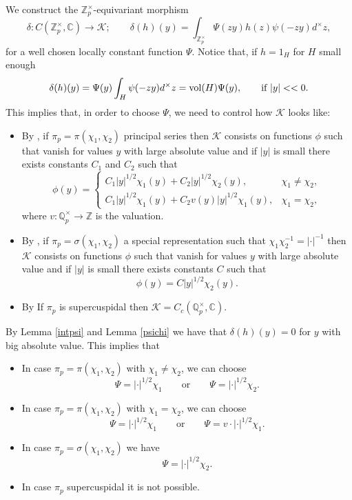 \documentclass{amsart}
\newcommand{\Z}{{\mathbb Z}}
\newcommand{\Q}{{\mathbb Q}}
\newcommand{\C}{{\mathbb C}}
\begin{document}
We construct the $\Z_p^\times$-equivariant morphism
\[
\delta:C(\Z_p^\times,\C)\longrightarrow \mathcal{K};\qquad \delta(h)(y)=\int_{\Z_p^\times}\Psi(zy)h(z)\psi(-zy)d^\times z,
\]
for a well chosen locally constant function $\Psi$. Notice that, if $h=1_{H}$ for $H$ small enough 
\[
\delta(h)(y)=\Psi(y)\int_{H}\psi(-zy)d^\times z={\rm vol}(H)\Psi(y),\qquad \mbox{if $|y|<<0$.}
\]
This implies that, in order to choose $\Psi$, we need to control how $\mathcal{K}$ looks like:
\begin{itemize}
\item By \cite[Theorem 4.7.2]{Bump}, if $\pi_p=\pi(\chi_1,\chi_2)$ principal series then $\mathcal{K}$ consists on functions $\phi$ such that vanish for values $y$ with large absolute value and if $|y|$ is small there exists constants $C_1$ and $C_2$ such that
\[
\phi(y)=\left\{\begin{array}{ll}C_1|y|^{1/2}\chi_1(y)+C_2|y|^{1/2}\chi_2(y),&\chi_1\neq\chi_2,\\C_1|y|^{1/2}\chi_1(y)+C_2v(y)|y|^{1/2}\chi_1(y),&\chi_1=\chi_2,\end{array}\right.
\]  
where $v:\Q_p^\times\rightarrow\Z$ is the valuation.

\item By \cite[Theorem 4.7.3]{Bump}, if $\pi_p=\sigma(\chi_1,\chi_2)$ a special representation such that $\chi_1\chi_2^{-1}=|\cdot|^{-1}$ then $\mathcal{K}$ consists on functions $\phi$ such that vanish for values $y$ with large absolute value and if $|y|$ is small there exists constants $C$ such that
\[
\phi(y)=C|y|^{1/2}\chi_2(y).
\]  

\item By \cite[Theorem 4.7.1]{Bump} If $\pi_p$ is supercuspidal then $\mathcal{K}=C_c(\Q_p^\times,\C)$.

\end{itemize}

By Lemma \ref{intpsi} and Lemma \ref{psichi} we have that $\delta(h)(y)=0$ for $y$ with big absolute value. This implies that 
\begin{itemize}
\item In case $\pi_p=\pi(\chi_1,\chi_2)$ with $\chi_1\neq\chi_2$, we can choose 
\[
\Psi=|\cdot|^{1/2}\chi_1\qquad\mbox{or}\qquad\Psi=|\cdot|^{1/2}\chi_2.
\]

\item In case $\pi_p=\pi(\chi_1,\chi_2)$ with $\chi_1=\chi_2$, we can choose 
\[
\Psi=|\cdot|^{1/2}\chi_1\qquad\mbox{or}\qquad\Psi=v\cdot|\cdot|^{1/2}\chi_1.
\]

\item In case $\pi_p=\sigma(\chi_1,\chi_2)$ we have 
\[
\Psi=|\cdot|^{1/2}\chi_2.
\]

\item In case $\pi_p$ supercuspidal it is not possible.
\end{itemize}
\end{document}
